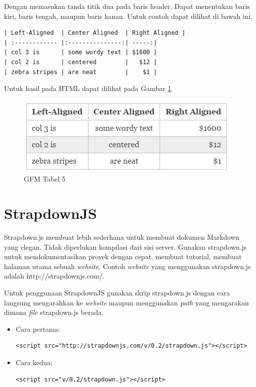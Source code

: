 Dengan memasukan tanda titik dua pada baris header. Dapat menentukan baris kiri,
baris tengah, maupun baris kanan. Untuk contoh dapat dilihat di bawah ini.
\begin{lstlisting}
| Left-Aligned  | Center Aligned  | Right Aligned |
| :------------ |:---------------:| -----:|
| col 3 is      | some wordy text | $1600 |
| col 2 is      | centered        |   $12 |
| zebra stripes | are neat        |    $1 |
\end{lstlisting}
Untuk hasil pada HTML dapat dilihat pada Gambar \ref{fig:t5}.
\begin{figure}[H]
\centering
\includegraphics[scale=1]{Gambar/t5.png}
\caption[GFM Tabel 5]{GFM Tabel 5}
\label{fig:t5}
\end{figure}

\section{StrapdownJS \cite{Strapdownjs:2014}}
\label{sec:stapdownjs}

Strapdown.js membuat lebih sederhana untuk membuat dokumen Markdown yang elegan.
Tidak diperlukan kompilasi dari sisi server. Gunakan strapdown.js untuk
mendokumentasikan proyek dengan cepat, membuat tutorial, membuat halaman utama
sebuah {\it website}. Contoh {\it website} yang menggunakan strapdown.js adalah
http://strapdownjs.com/.

Untuk penggunaan StrapdownJS gunakan skrip strapdown.js dengan cara langsung
mengarahkan ke {\it website} maupun menggunakan {\it path} yang mengarakan
dimana {\it file} strapdown.js berada.
\begin{itemize}
\item Cara pertama:\\
\begin{lstlisting}
<script src="http://strapdownjs.com/v/0.2/strapdown.js"></script>
\end{lstlisting}
\item Cara kedua:\\
\begin{lstlisting}
<script src="v/0.2/strapdown.js"></script>
\end{lstlisting}
\end{itemize}

